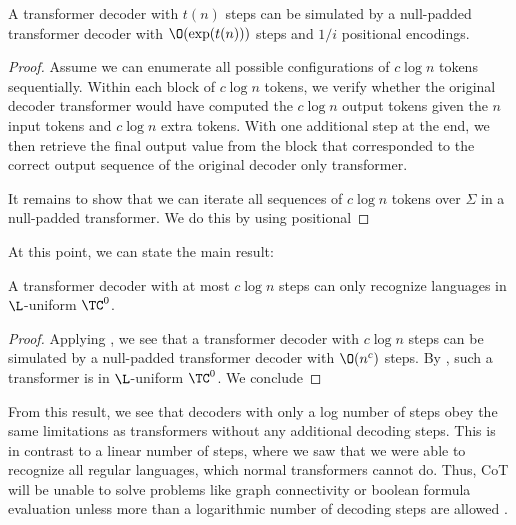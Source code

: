 \begin{lemma} \label{lem:null-padding}
    A transformer decoder with $t(n)$ steps can be simulated by a null-padded transformer decoder with $\O(\exp(t(n)))$ steps and $1/i$ positional encodings.
\end{lemma}

\begin{proof}
    Assume we can enumerate all possible configurations of $c \log n$ tokens sequentially. Within each block of $c \log n$ tokens, we verify whether the original decoder transformer would have computed the $c \log n$ output tokens given the $n$ input tokens and $c \log n$ extra tokens. With one additional step at the end, we then retrieve the final output value from the block that corresponded to the correct output sequence of the original decoder only transformer.

    It remains to show that we can iterate all sequences of $c \log n$ tokens over $\Sigma$ in a null-padded transformer. We do this by using positional 

\end{proof}

At this point, we can state the main result:

\begin{theorem} \label{thm:tc0-upper-bound}
    A transformer decoder with at most $c \log n$ steps can only recognize languages in $\L$-uniform $\TC^0$.  
\end{theorem}

\begin{proof}
    Applying , we see that a transformer decoder with $c \log n$ steps can be simulated by a null-padded transformer decoder with $\O(n^c)$ steps. By , such a transformer is in $\L$-uniform $\TC^0$. We conclude 
\end{proof}

From this result, we see that decoders with only a log number of steps obey the same limitations as transformers without any additional decoding steps. This is in contrast to a linear number of steps, where we saw that we were able to recognize all regular languages, which normal transformers cannot do. Thus, CoT will be unable to solve problems like graph connectivity or boolean formula evaluation unless more than a logarithmic number of decoding steps are allowed \citep{merrill2023parallelism}.